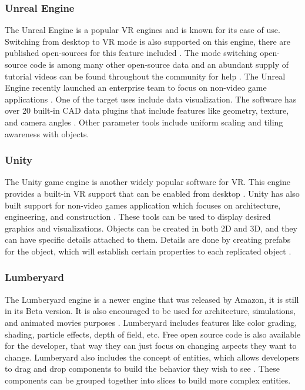 \documentclass[onecolumn, draftclsnofoot, 10pt, compsoc]{IEEEtran}
\begin{document}
\subsubsection{Unreal Engine}
\begin{singlespace}
The Unreal Engine is a popular VR engines and is known for its ease of use. Switching from desktop to VR mode is also supported on this engine, there are published open-sources for this feature included \cite{UE4 forum}. The mode switching open-source code is among many other open-source data and an abundant supply of tutorial videos can be found throughout the community for help \cite{UE4 EG}. The Unreal Engine recently launched an enterprise team to focus on non-video game applications \cite{UE4E QA}. One of the target uses include data visualization. The software has over 20 built-in CAD data plugins that include features like geometry, texture, and camera angles \cite{UE4E GFX}. Other parameter tools include uniform scaling and tiling awareness with objects. 

\end{singlespace}

\subsubsection{Unity}
\begin{singlespace}
The Unity game engine is another widely popular software for VR. This engine provides a built-in VR support that can be enabled from desktop \cite{unity3d}. Unity has also built support for non-video games application which focuses on architecture, engineering, and construction \cite{unity AEC}. These tools can be used to display desired graphics and visualizations. Objects can be created in both 2D and 3D, and they can have specific details attached to them. Details are done by creating prefabs for the object, which will establish certain properties to each replicated object \cite{unity3d}.  
 
\end{singlespace}

\subsubsection{Lumberyard}
\begin{singlespace}
The Lumberyard engine is a newer engine that was released by Amazon, it is still in its Beta version. It is also encouraged to be used for architecture, simulations, and animated movies purposes \cite{lumberyard}. Lumberyard includes features like color grading, shading, particle effects, depth of field, etc. Free open source code is also available for the developer, that way they can just focus on changing aspects they want to change. Lumberyard also includes the concept of entities, which allows developers to drag and drop components to build the behavior they wish to see \cite{lumberyard}. These components can be grouped together into slices to build more complex entities.  
\end{singlespace}
\end{document}
